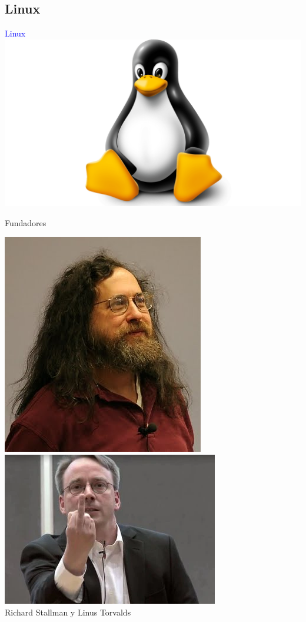 \documentclass[10pt,xcolor={dvipsnames}]{beamer}
\begin{document}
\subsection{Linux}
\begin{frame}
\begin{center}
\Huge{\textcolor{blue}{Linux}} \\ \vspace{0.5cm}
\includegraphics[scale=0.15]{Figures/LINUX}
\end{center}
\end{frame}

\begin{frame}{Fundadores}
\begin{center}
\includegraphics[scale=0.3]{Figures/Richard_Stallman}
\includegraphics[scale=0.58]{Figures/Linus} \\
Richard Stallman y Linus Torvalds
\end{center}
\end{frame}
\end{document}

